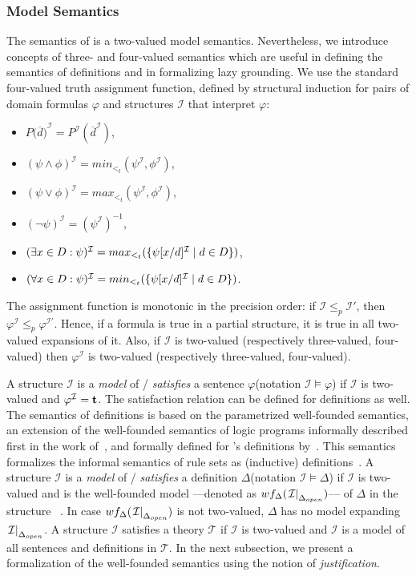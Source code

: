 \documentclass[11pt]{article}
\newcommand{\m}[1]{\ensuremath{#1}\xspace}
\newcommand{\trval}[1]{\m{{\bf #1}}}
\newcommand{\ltrue}{\trval{t}}
\newcommand{\I}{\m{\mathcal{I}}}
\newcommand{\theory}{\m{\mathcal{T}}}
\newcommand{\D}{\m{\Delta}}
\newcommand{\f}{\m{\varphi}}
\newcommand{\open}[1]{\m{#1_{open}}}
\newcommand{\ddd}{\m{\overline{d}}}
\newcommand{\bracketddd}{\m{\big(\overline{d}\big)}}
\newcommand{\logicname}[1]{\text{\sc #1}\xspace}
\newcommand{\foid}{\logicname{FO(\ensuremath{ID})}}
\theoremstyle{plain}
\theoremstyle{definition}
\theoremstyle{example_basic}
\theoremstyle{example_contd}
\theoremstyle{plain}
\newcommand{\change}[1]{#1}
\begin{document}
\subsubsection{Model Semantics}
\change{The semantics of \foid is a two-valued model semantics. Nevertheless, we
introduce concepts of three- and four-valued semantics which are
useful in defining the semantics of definitions and in 
formalizing lazy grounding. We use the standard four-valued truth
assignment function, defined by structural induction for pairs of \FO
domain formulas $\f$ and structures $\I$ that interpret
$\f$:}
\begin{itemize}
\item $P\bracketddd^\I = P^\I(\ddd^\I)$,
\item $(\psi\land\phi)^\I=min_{<_t}(\psi^\I,\phi^\I)$,
\item $(\psi\lor\phi)^\I=max_{<_t}(\psi^\I,\phi^\I)$,
\item $(\neg\psi)^\I=(\psi^\I)^{-1}$,
\item $(\exists x \in D: \psi)^\I=max_{<_t}(\{\psi[x\subs d]^\I \mid d\in D\})$,
\item $(\forall x \in D: \psi)^\I=min_{<_t}(\{\psi[x\subs d]^\I \mid d\in D\})$.
\end{itemize}
The assignment function is monotonic in the precision order: if $\I\leq_p \I'$, then $\f^\I\leq_p\f^{\I'}$.  Hence, if a formula is true in a partial structure, it is true in all two-valued expansions of it. \change{Also, if $\I$ is two-valued (respectively three-valued, four-valued) then $\f^\I$ is two-valued (respectively three-valued, four-valued).}

A structure \I is a \emph{model} of / \emph{satisfies} a sentence \f (notation $\I \models \f$) if \I is two-valued and $\evali{\f}=\ltrue$. The satisfaction relation can be defined for definitions as well. The semantics of definitions is based on the parametrized well-founded semantics, an extension of the well-founded semantics of logic programs informally described first in the work of~, and formally defined for \foid's definitions by~. This semantics formalizes the informal semantics of rule sets as (inductive) definitions~\cite{Denecker98,tocl/DeneckerBM01,KR/DeneckerV14}.  A structure \I is a \emph{model} of / \emph{satisfies} a definition \D (notation $\I \models \D$) if \I is two-valued and is the well-founded model ---denoted as $wf_\D(\restr{\I}{\open{\D}})$--- of \D in the structure \restr{\I}{\open{\D}}~\cite{tocl/DeneckerT08}. In case $wf_\D(\restr{\I}{\open{\D}})$ is not two-valued, $\D$ has no model expanding $\restr{\I}{\open{\D}}$. A structure \I satisfies a theory \theory if \I is two-valued and \I is a model of all sentences and definitions in \theory. In the next subsection, we present a formalization of the well-founded semantics using the notion of {\em justification}.
\end{document}
